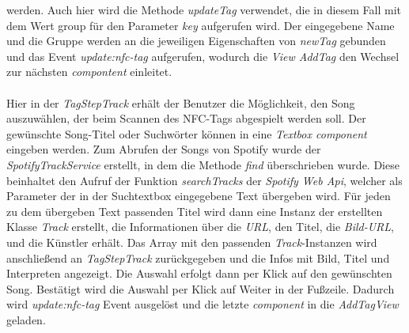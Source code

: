 \documentclass[10pt, a4paper]{article}
\begin{document}
werden. Auch hier wird die Methode \textit{updateTag} verwendet, die in diesem Fall mit dem Wert \glqq group \grqq{} für den Parameter \textit{key} aufgerufen wird. Der eingegebene Name und die Gruppe werden an die jeweiligen Eigenschaften von \textit{newTag} gebunden und das Event \textit{update:nfc-tag} aufgerufen, wodurch die \textit{View AddTag} den Wechsel zur nächsten \textit{compontent} einleitet.
\\~\\
Hier in der \textit{TagStepTrack} erhält der Benutzer die Möglichkeit, den Song auszuwählen, der beim Scannen des NFC-Tags abgespielt werden soll.
Der gewünschte Song-Titel oder Suchwörter können in eine \textit{Textbox component} eingeben werden. Zum Abrufen der Songs von Spotify wurde der \textit{SpotifyTrackService} erstellt, in dem die Methode \textit{find} überschrieben wurde.
Diese beinhaltet den Aufruf der Funktion \textit{searchTracks} der \textit{Spotify Web Api}, welcher als Parameter der in der Suchtextbox eingegebene Text übergeben wird.
Für jeden zu dem übergeben Text passenden Titel wird dann eine Instanz der erstellten Klasse \textit{Track} erstellt, die Informationen über die \textit{URL}, den Titel, die \textit{Bild-URL}, und die Künstler erhält. Das Array mit den passenden \textit{Track}-Instanzen wird anschließend an \textit{TagStepTrack} zurückgegeben und die Infos mit Bild, Titel und Interpreten angezeigt. Die Auswahl erfolgt dann per Klick auf den gewünschten Song.
Bestätigt wird die Auswahl per Klick auf \glqq Weiter\grqq{} in der Fußzeile.
Dadurch wird \textit{update:nfc-tag} Event ausgelöst und die letzte \textit{component} in die \textit{AddTagView} geladen.
\\~\\
\end{document}

